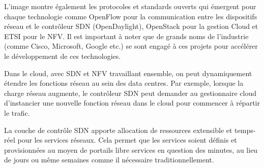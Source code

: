 L'image montre également les protocoles et standards ouverts qui émergent pour chaque technologie comme OpenFlow pour la communication entre les dispositifs réseau et le contrôleur SDN (OpenDaylight), OpenStack pour la gestion Cloud et ETSI pour le NFV. Il est important à noter que de grands noms de l’industrie (comme Cisco, Microsoft, Google etc.) se sont engagé à ces projets pour accélérer le développement de ces technologies.

Dans le cloud, avec SDN et NFV travaillant ensemble, on peut dynamiquement étendre les fonctions réseau au sein des data centres. Par exemple, lorsque la charge réseau augmente, le contrôleur SDN peut demander au gestionnaire cloud d'instancier une nouvelle fonction réseau dans le cloud pour commencer à répartir le trafic. 



La couche de contrôle SDN apporte allocation de ressources extensible et temps-réel pour les services réseaux. Cela permet que les services soient définis et provisionnées au moyen de portails libre services en question des minutes, au lieu de jours ou même semaines comme il nécessaire traditionnellement.


